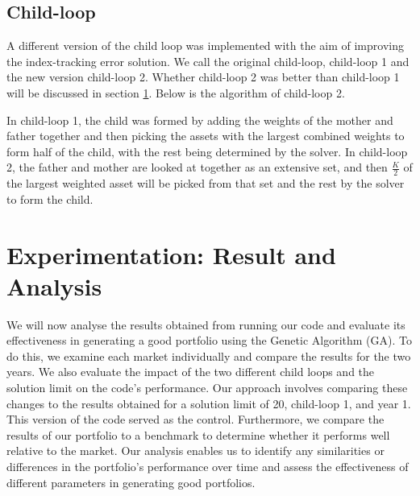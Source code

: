 \documentclass[12pt]{report}
\begin{document}
\subsection*{Child-loop}
A different version of the child loop was implemented with the aim of improving the index-tracking error solution. We call the original child-loop, child-loop 1 and the new version child-loop 2. Whether child-loop 2 was better than child-loop 1 will be discussed in section \ref{results}. 
Below is the algorithm of child-loop 2.
\begin{algorithm}[h!]
\end{algorithm}
\noindent
In child-loop 1, the child was formed by adding the weights of the mother and father together and then picking the assets with the largest combined weights to form half of the child, with the rest being determined by the solver. In child-loop 2, the father and mother are looked at together as an extensive set, and then $\frac{K}{2}$ of the largest weighted asset will be picked from that set and the rest by the solver to form the child.

\section{Experimentation: Result and Analysis} \label{results}
We will now analyse the results obtained from running our code and evaluate its effectiveness in generating a good portfolio using the Genetic Algorithm (GA). To do this, we examine each market individually and compare the results for the two years. We also evaluate the impact of the two different child loops and the solution limit on the code's performance. Our approach involves comparing these changes to the results obtained for a solution limit of 20, child-loop 1, and year 1. This version of the code served as the control. Furthermore, we compare the results of our portfolio to a benchmark to determine whether it performs well relative to the market. Our analysis enables us to identify any similarities or differences in the portfolio's performance over time and assess the effectiveness of different parameters in generating good portfolios. 
\end{document}
